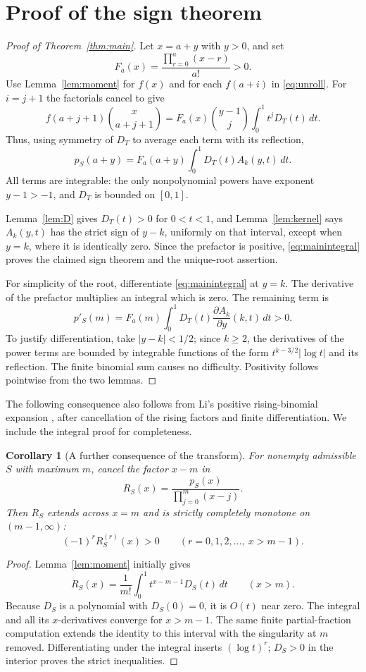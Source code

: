 \documentclass[11pt]{article}
\newtheorem{corollary}[theorem]{Corollary}
\theoremstyle{definition}
\begin{document}
\section{Proof of the sign theorem}
\begin{proof}[Proof of Theorem~\ref{thm:main}]
Let $x=a+y$ with $y>0$, and set
\[
 F_a(x)=\frac{\prod_{r=0}^{a}(x-r)}{a!}>0.
\]
Use Lemma~\ref{lem:moment} for $f(x)$ and for each $f(a+i)$ in \eqref{eq:unroll}. For $i=j+1$ the factorials cancel to give
\[
 f(a+j+1)\binom{x}{a+j+1}
 =F_a(x)\binom{y-1}{j}\int_0^1t^jD_T(t)\,dt.
\]
Thus, using symmetry of $D_T$ to average each term with its reflection,
\begin{equation}\label{eq:mainintegral}
 p_S(a+y)=F_a(a+y)\int_0^1D_T(t)A_k(y,t)\,dt.
\end{equation}
All terms are integrable: the only nonpolynomial powers have exponent $y-1>-1$, and $D_T$ is bounded on $[0,1]$.

Lemma~\ref{lem:D} gives $D_T(t)>0$ for $0<t<1$, and Lemma~\ref{lem:kernel} says $A_k(y,t)$ has the strict sign of $y-k$, uniformly on that interval, except when $y=k$, where it is identically zero. Since the prefactor is positive, \eqref{eq:mainintegral} proves the claimed sign theorem and the unique-root assertion.

For simplicity of the root, differentiate \eqref{eq:mainintegral} at $y=k$. The derivative of the prefactor multiplies an integral which is zero. The remaining term is
\[
 p'_S(m)=F_a(m)\int_0^1D_T(t)\frac{\partial A_k}{\partial y}(k,t)\,dt>0.
\]
To justify differentiation, take $|y-k|<1/2$; since $k\ge2$, the derivatives of the power terms are bounded by integrable functions of the form $t^{k-3/2}|\log t|$ and its reflection. The finite binomial sum causes no difficulty. Positivity follows pointwise from the two lemmas.
\end{proof}

The following consequence also follows from Li's positive rising-binomial
expansion \cite[Eq.~(2), Theorem~1.1]{Li}, after cancellation of the rising
factors and finite differentiation. We include the integral proof for completeness.

\begin{corollary}[A further consequence of the transform]
For nonempty admissible $S$ with maximum $m$, cancel the factor $x-m$ in
\[
 R_S(x)=\frac{p_S(x)}{\prod_{j=0}^{m}(x-j)}.
\]
Then $R_S$ extends across $x=m$ and is strictly completely monotone on $(m-1,\infty)$:
\[
 (-1)^rR_S^{(r)}(x)>0\qquad(r=0,1,2,\ldots,\ x>m-1).
\]
\end{corollary}
\begin{proof}
Lemma~\ref{lem:moment} initially gives
\[
 R_S(x)=\frac1{m!}\int_0^1t^{x-m-1}D_S(t)\,dt\qquad(x>m).
\]
Because $D_S$ is a polynomial with $D_S(0)=0$, it is $O(t)$ near zero. The integral and all its $x$-derivatives converge for $x>m-1$. The same finite partial-fraction computation extends the identity to this interval with the singularity at $m$ removed. Differentiating under the integral inserts $(\log t)^r$; $D_S>0$ in the interior proves the strict inequalities.
\end{proof}
\end{document}

